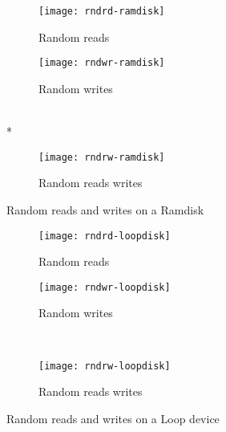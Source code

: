 \begin{figure}[!ht]
  \begin{subfigure}[b]{0.2\textwidth}
  \texttt{[image: rndrd-ramdisk]}
  \caption{Random reads}
  \label{subfig:rndrd-ramdisk}
  \end{subfigure}
  \hspace{50mm}
  \begin{subfigure}[b]{0.2\textwidth}
  \texttt{[image: rndwr-ramdisk]}
  \caption{Random writes}
  \label{subfig:rndwr-ramdisk}
  \end{subfigure}\\*
  \hspace{150mm}
  \begin{subfigure}[b]{0.3\textwidth}
  \texttt{[image: rndrw-ramdisk]}
  \caption{Random reads writes}
  \label{subfig:rndrw-ramdisk}
  \end{subfigure}
  \caption{Random reads and writes on a Ramdisk}\label{fig:rndramdisk}
\end{figure}

\begin{figure}[!ht]
  \begin{subfigure}[b]{0.2\textwidth}
  \texttt{[image: rndrd-loopdisk]}
  \caption{Random reads}
  \label{subfig:rndrd-loopdisk}
  \end{subfigure}
  \hspace{50mm}
  \begin{subfigure}[b]{0.2\textwidth}
  \texttt{[image: rndwr-loopdisk]}
  \caption{Random writes}
  \label{subfig:rndwr-loopdisk}
  \end{subfigure}\\
  \begin{subfigure}[b]{0.3\textwidth}
  \texttt{[image: rndrw-loopdisk]}
  \caption{Random reads writes}
  \label{subfig:rndrw-loopdisk}
  \end{subfigure}
\caption{Random reads and writes on a Loop device}\label{fig:rndloopdisk}
\end{figure}

